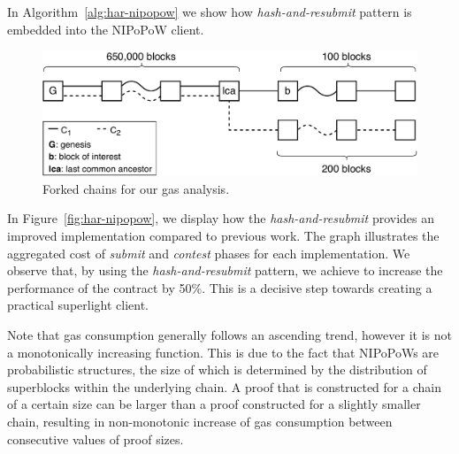 In Algorithm~\ref{alg:har-nipopow} we show how \emph{hash-and-resubmit} pattern
is embedded into the NIPoPoW client.

\begin{figure}[!h]
    \begin{center}
        \includegraphics[width=1\columnwidth]{figures/nipopow-subm-cont}
    \end{center}
    \caption{Forked chains for our gas analysis.}
    \label{fig:chains}
\vspace*{-3mm}
\end{figure}

In Figure~\ref{fig:har-nipopow}, we display how the \emph{hash-and-resubmit}
provides an improved implementation compared to previous work. The graph
illustrates the aggregated cost of \emph{submit} and \emph{contest} phases for
each implementation. We observe that, by using the \emph{hash-and-resubmit}
pattern, we achieve to increase the performance of the contract by 50\%. This
is a decisive step towards creating a practical superlight client.

Note that gas consumption generally follows an ascending trend, however it
is not a monotonically increasing function. This is due to the fact that
NIPoPoWs are probabilistic structures, the size of which is determined by the
distribution of superblocks within the underlying chain. A proof that is
constructed for a chain of a certain size can be larger than a proof
constructed for a slightly smaller chain, resulting in non-monotonic increase
of gas consumption between consecutive values of proof sizes.



